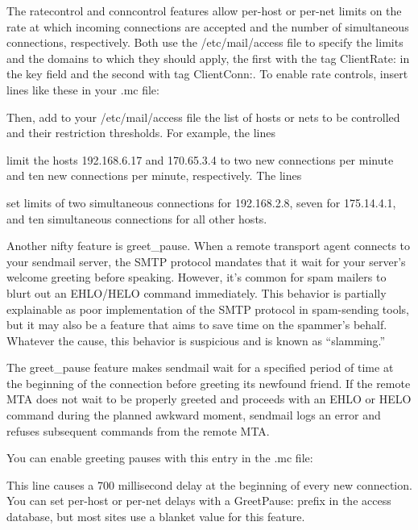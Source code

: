 The {ratecontrol} and {conncontrol} features allow per-host or per-net
limits on the rate at which incoming connections are accepted and the
number of simultaneous connections, respectively. Both use the
{/etc/mail/access} file to specify the limits and the domains to which
they should apply, the first with the tag {ClientRate:} in the key field
and the second with tag {ClientConn:}. To enable rate controls, insert
lines like these in your {.mc} file:


Then, add to your {/etc/mail/access} file the list of hosts or nets to
be controlled and their restriction thresholds. For example, the lines


limit the hosts 192.168.6.17 and 170.65.3.4 to two new connections per
minute and ten new connections per minute, respectively. The lines


set limits of two simultaneous connections for 192.168.2.8, seven for
175.14.4.1, and ten simultaneous connections for all other hosts.

Another nifty feature is {greet\_pause}. When a remote transport agent
connects to your {sendmail} server, the SMTP protocol mandates that it
wait for your server's welcome greeting before speaking. However, it's
common for spam mailers to blurt out an EHLO/HELO command immediately.
This behavior is partially explainable as poor implementation of the
SMTP protocol in spam-sending tools, but it may also be a feature that
aims to save time on the spammer's behalf. Whatever the cause, this
behavior is suspicious and is known as ``slamming.''

The {greet\_pause} feature makes {sendmail} wait for a specified period
of time at the beginning of the connection before greeting its newfound
friend. If the remote MTA does not wait to be properly greeted and
proceeds with an EHLO or HELO command during the planned awkward moment,
{sendmail} logs an error and refuses subsequent commands from the remote
MTA.

You can enable greeting pauses with this entry in the {.mc} file:


This line causes a 700 millisecond delay at the beginning of every new
connection. You can set per-host or per-net delays with a {GreetPause:}
prefix in the access database, but most sites use a blanket value for
this feature.

